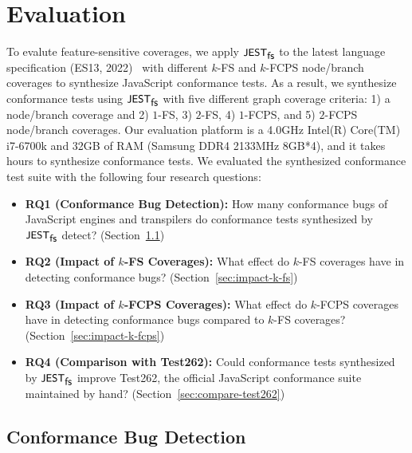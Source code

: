 \section{Evaluation}\label{sec:eval}

To evalute feature-sensitive coverages, we apply $\textsf{\small JEST}_{\textsf{\small fs}}$ to the latest language
specification (ES13, 2022)~\cite{es13} with different $k$-FS and $k$-FCPS
node/branch coverages to synthesize JavaScript conformance tests.
%
As a result, we synthesize  conformance tests using $\textsf{\small JEST}_{\textsf{\small fs}}$ with
five different graph coverage criteria: 1) a node/branch coverage and 2) $1$-FS,
3) $2$-FS, 4) $1$-FCPS, and 5) $2$-FCPS node/branch coverages.
%
Our evaluation platform is a 4.0GHz Intel(R) Core(TM) i7-6700k and 32GB of RAM
(Samsung DDR4 2133MHz 8GB*4), and it takes  hours to synthesize
conformance tests.
%
We evaluated the synthesized conformance test suite with the following four
research questions:
\begin{itemize}
  \item \textbf{RQ1 (Conformance Bug Detection):} How many conformance bugs of
    JavaScript engines and transpilers do conformance tests synthesized by
    $\textsf{\small JEST}_{\textsf{\small fs}}$ detect? (Section~\ref{sec:conform-bug})
  \item \textbf{RQ2 (Impact of $k$-FS Coverages):} What effect do $k$-FS
    coverages have in detecting conformance bugs?
    (Section~\ref{sec:impact-k-fs})
  \item \textbf{RQ3 (Impact of $k$-FCPS Coverages):} What effect do $k$-FCPS
    coverages have in detecting conformance bugs compared to $k$-FS coverages?
    (Section~\ref{sec:impact-k-fcps})
  \item \textbf{RQ4 (Comparison with Test262):} Could conformance tests
    synthesized by $\textsf{\small JEST}_{\textsf{\small fs}}$ improve Test262, the official JavaScript conformance
    suite maintained by hand? (Section~\ref{sec:compare-test262})
\end{itemize}


\subsection{Conformance Bug Detection}\label{sec:conform-bug}

